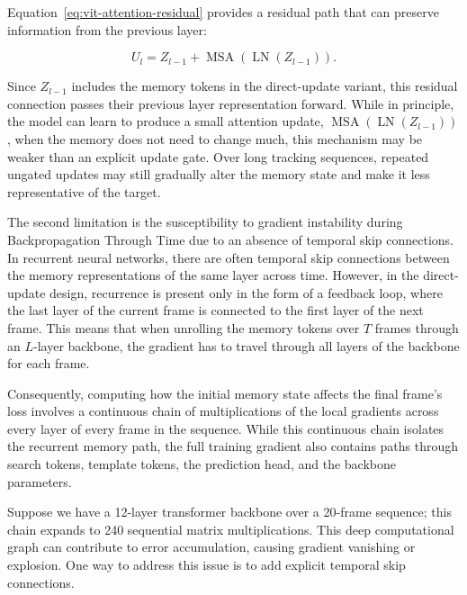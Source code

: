 \documentclass[bachelorthesis]{fer}
\numberwithin{equation}{chapter}
\begin{document}
    Equation~\eqref{eq:vit-attention-residual} provides a residual path that can preserve information from the
    previous layer:

    \begin{equation}
        U_l =
        Z_{l-1}
        +
        \operatorname{MSA}\left(\operatorname{LN}(Z_{l-1})\right).
        \label{eq:vit-attention-residual}
    \end{equation}

    Since \(Z_{l-1}\) includes the memory tokens in the direct-update variant,
    this residual connection passes their previous layer representation forward.
    While in principle, the model can learn to produce a small attention update,
    \(\operatorname{MSA}(\operatorname{LN}(Z_{l-1}))\),
    when the memory does not need to change much, this mechanism may be weaker than an explicit update gate.
    Over long tracking sequences, repeated ungated updates may still gradually alter the memory state and make it less representative of the target.


    The second limitation is the susceptibility to gradient instability during Backpropagation Through Time due
    to an absence of temporal skip connections. In recurrent neural networks, there are often temporal skip connections
    between the memory representations of the same layer across time. However, in the direct-update design, recurrence is
    present only in the form of a feedback loop, where the last layer of the current frame is connected to the first layer
    of the next frame. This means that when unrolling the memory tokens over \(T\) frames through an \(L\)-layer backbone, the
    gradient has to travel through all layers of the backbone for each frame.

    Consequently, computing how the initial memory state affects the final frame's loss involves a continuous chain of multiplications of the local gradients across every layer of every frame in the sequence. While this continuous chain isolates the recurrent memory path, the full training gradient also contains paths through search tokens, template tokens, the prediction head, and the backbone parameters.

    Suppose we have a 12-layer transformer backbone over a 20-frame sequence; this chain expands to 240 sequential matrix multiplications. This deep computational graph can contribute to error accumulation, causing gradient vanishing or explosion. One way to address this issue is to add explicit temporal skip connections.
\end{document}
